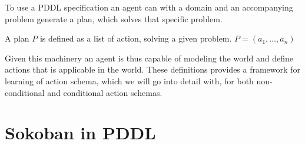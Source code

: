 \documentclass[../Master.tex]{subfiles}
\begin{document}
To use a PDDL specification an agent can with a domain and an accompanying problem generate a plan, which solves that specific problem.

\begin{definition}[Plan] 
	A plan $P$ is defined as a list of action, solving a given problem.
	$P = (a_1,\dots,a_n)$
\end{definition}

Given this machinery an agent is thus capable of modeling the world and define actions that is applicable in the world. These definitions provides a framework for learning of action schema, which we will go into detail with, for both non-conditional and conditional action schemas.


\section{Sokoban in PDDL}\label{sec:SokobanPDDL}
    
\end{document}

